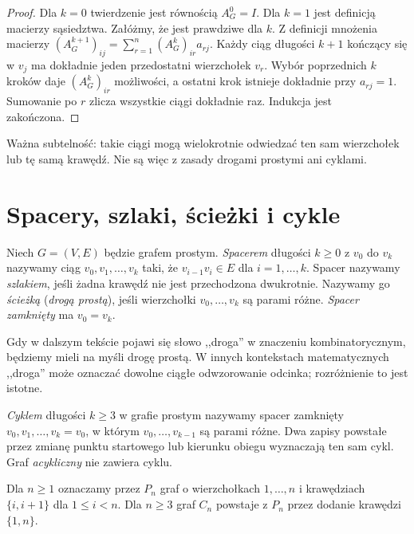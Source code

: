 \begin{proof}
Dla $k=0$ twierdzenie jest równością $A_G^0=I$.
Dla $k=1$ jest definicją macierzy sąsiedztwa.
Załóżmy, że jest prawdziwe dla $k$. Z definicji
mnożenia macierzy
$(A_G^{k+1})_{ij}=\sum_{r=1}^n(A_G^k)_{ir}a_{rj}$.
Każdy ciąg długości $k+1$ kończący się w $v_j$
ma dokładnie jeden przedostatni wierzchołek $v_r$.
Wybór poprzednich $k$ kroków daje $(A_G^k)_{ir}$
możliwości, a ostatni krok istnieje dokładnie przy
$a_{rj}=1$. Sumowanie po $r$ zlicza wszystkie
ciągi dokładnie raz. Indukcja jest zakończona.
\end{proof}

Ważna subtelność: takie ciągi mogą wielokrotnie odwiedzać
ten sam wierzchołek lub tę samą krawędź. Nie są więc z zasady
drogami prostymi ani cyklami.

\section{Spacery, szlaki, ścieżki i cykle}
\label{sec:tg-drogi}

\begin{definicja}
Niech $G=(V,E)$ będzie grafem prostym.
\emph{Spacerem} długości $k\ge0$ z $v_0$ do $v_k$
nazywamy ciąg $v_0,v_1,\ldots,v_k$ taki, że
$v_{i-1}v_i\in E$ dla $i=1,\ldots,k$.
Spacer nazywamy \emph{szlakiem}, jeśli żadna
krawędź nie jest przechodzona dwukrotnie.
Nazywamy go \emph{ścieżką} (\emph{drogą prostą}), jeśli
wierzchołki $v_0,\ldots,v_k$ są parami różne.
\emph{Spacer zamknięty} ma $v_0=v_k$.
\end{definicja}

Gdy w dalszym tekście pojawi się słowo ,,droga'' w znaczeniu
kombinatorycznym, będziemy mieli na myśli drogę prostą. W innych kontekstach matematycznych
,,droga'' może oznaczać dowolne ciągłe odwzorowanie odcinka;
rozróżnienie to jest istotne.

\begin{definicja}[Cykl]
\emph{Cyklem} długości $k\ge3$ w grafie prostym
nazywamy spacer zamknięty $v_0,v_1,\ldots,v_k=v_0$,
w którym $v_0,\ldots,v_{k-1}$ są parami różne.
Dwa zapisy powstałe przez zmianę punktu startowego
lub kierunku obiegu wyznaczają ten sam cykl.
Graf \emph{acykliczny} nie zawiera cyklu.
\end{definicja}

Dla $n\ge1$ oznaczamy przez $P_n$ graf o wierzchołkach
$1,\ldots,n$ i krawędziach $\{i,i+1\}$ dla $1\le i<n$.
Dla $n\ge3$ graf $C_n$ powstaje z $P_n$ przez dodanie
krawędzi $\{1,n\}$.

